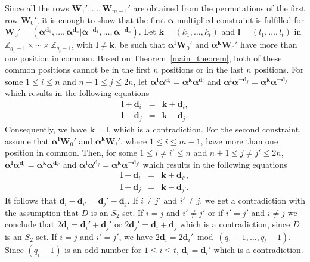 \documentclass[journal,draftclsnofoot,onecolumn,12pt,twoside]{IEEEtran}
\begin{document}
\begin{IEEEproof}
Since all the rows $\mathbf{W}_1',\ldots,\mathbf{W}_{m-1}'$ are obtained from the  permutations of the first row $\mathbf{W}_0'$, it is enough to show that the first $\boldsymbol{\alpha}$-multiplied constraint is fulfilled for  $\mathbf{W}_0'=(\boldsymbol{\alpha}^{\mathbf{d}_1},\ldots,\boldsymbol{\alpha}^{\mathbf{d}_n}|\boldsymbol{\alpha}^{-\mathbf{d}_1},\ldots,\boldsymbol{\alpha}^{-\mathbf{d}_n})$. Let $\mathbf{k}=(k_1,\ldots,k_t)$ and $\mathbf{l}=(l_1,\ldots,l_t)$ in $\mathbb{Z}_{q_1-1}\times\cdots \times \mathbb{Z}_{q_t-1}$, with $\mathbf{l}\neq \mathbf{k}$, be such that $\boldsymbol{\alpha}^{\mathbf{l}}\mathbf{W}_0'$ and $\boldsymbol{\alpha}^{\mathbf{k}} \mathbf{W}_0'$ have more than one position in common. Based on Theorem~\ref{main_theorem}, both of these common positions cannot be in the first $n$ positions or in the last $n$ positions. For some $1\leq i\leq n$ and $n+1\leq  j\leq 2n$, let $\boldsymbol{\alpha}^{\mathbf{l}}\boldsymbol{\alpha}^{\mathbf{d}_i}=\boldsymbol{\alpha}^{\mathbf{k}} \boldsymbol{\alpha}^{\mathbf{d}_{i}}$ and  $\boldsymbol{\alpha}^{\mathbf{l}}\boldsymbol{\alpha}^{-\mathbf{d}_j}=\boldsymbol{\alpha}^{\mathbf{k}} \boldsymbol{\alpha}^{-\mathbf{d}_{j}}$ which results in the following equations
\begin{eqnarray*}
\mathbf{l}+\mathbf{d}_{i}&=&\mathbf{k}+\mathbf{d}_{i},\\
\mathbf{l}-\mathbf{d}_{j}&=&\mathbf{k}-\mathbf{d}_{j}.
\end{eqnarray*}
Consequently, we have $\mathbf{k}=\mathbf{l}$, which is a contradiction. For the second constraint, assume that $\boldsymbol{\alpha}^{\mathbf{l}}\mathbf{W}_0'$ and $\boldsymbol{\alpha}^{\mathbf{k}} \mathbf{W}_i'$, where $1\leq i\leq m-1$, have more than one position in common.
Then, for some $1\leq i\neq i'\leq n$ and $n+1\leq  j\neq j'\leq 2n$, $\boldsymbol{\alpha}^{\mathbf{l}}\boldsymbol{\alpha}^{\mathbf{d}_i}=\boldsymbol{\alpha}^{\mathbf{k}} \boldsymbol{\alpha}^{\mathbf{d}_{i'}}$ and  $\boldsymbol{\alpha}^{\mathbf{l}}\boldsymbol{\alpha}^{\mathbf{d}_j}=\boldsymbol{\alpha}^{\mathbf{k}} \boldsymbol{\alpha}^{-\mathbf{d}_{j'}}$ which results in the following equations
 \begin{eqnarray*}
\mathbf{l}+\mathbf{d}_{i}&=&\mathbf{k}+\mathbf{d}_{i'},\\
\mathbf{l}-\mathbf{d}_{j}&=&\mathbf{k}-\mathbf{d}_{j'}.
\end{eqnarray*}
It follows that  $\mathbf{d}_i-\mathbf{d}_{i'}=\mathbf{d}_j'-\mathbf{d}_{j}$. If $i\neq j'$ and $i'\neq j$, we get a contradiction with the assumption that $D$ is an $S_2$-set. If $i=j$ and $i'\neq j'$ or if $i'=j'$ and $i\neq j$ we conclude that $2\mathbf{d}_i=\mathbf{d}_i'+\mathbf{d}_j'$ or $2\mathbf{d}_j'=\mathbf{d}_i+\mathbf{d}_j$ which is a contradiction, since $D$ is an $S_2$-set. If $i=j$ and $i'=j'$, we have
$
  2\mathbf{d}_i = 2\mathbf{d}_i' \bmod (q_1-1,\ldots, q_t-1)$. Since $(q_i-1)$ is an odd number for $1\leq i\leq t$, $\mathbf{d}_i=\mathbf{d}_i'$ which is a contradiction.
\end{IEEEproof}
\end{document}
